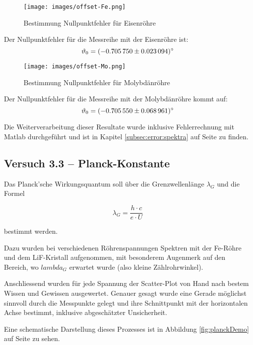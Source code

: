 \begin{figure}[h!]
    \centering
    \texttt{[image: images/offset-Fe.png]}
    \caption{Bestimmung Nullpunktfehler f\"ur Eisenr\"ohre}
    \label{fig:offset:fe}
\end{figure}
Der Nullpunktfehler f\"ur die Messreihe mit der Eisenr\"ohre ist:
$$\vartheta_0 = \SI{-0.70575 \pm 0.023094}{\degree}$$

\begin{figure}[h!]
    \centering
    \texttt{[image: images/offset-Mo.png]}
    \caption{Bestimmung Nullpunktfehler f\"ur Molybd\"anr\"ohre}
    \label{fig:offset:mo}
\end{figure}
Der Nullpunktfehler f\"ur die Messreihe mit der Molybd\"anr\"ohre kommt auf:
$$\vartheta_0 = \SI{-0.70555 \pm 0.068961}{\degree}$$

Die  Weiterverarbeitung dieser  Resultate wurde  inklusive Fehlerrechnung  mit
Matlab durchgef\"uhrt und ist  in Kapitel \ref{subsec:error:spektra} auf Seite
\pageref{subsec:error:spektra} zu finden.

\clearpage
\subsection{Versuch 3.3 -- Planck-Konstante}
\label{subsec:planck}

Das Planck'sche Wirkungsquantum soll \"uber die Grenzwellenl\"ange $\lambda_G$ und
die Formel

\begin{equation*}
    \lambda_G = \frac{h \cdot c}{e \cdot U}
\end{equation*}

bestimmt werden.

Dazu wurden  bei verschiedenen R\"ohrenspannungen Spektren  mit der Fe-R\"ohre
und dem LiF-Kristall aufgenommen, mit besonderem Augenmerk auf den Bereich, wo
$lambda_G$ erwartet wurde (also kleine Z\"ahlrohrwinkel).

Anschliessend  wurden  f\"ur jede  Spannung  der  Scatter-Plot von  Hand  nach
bestem  Wissen  und Gewissen  ausgewertet. Genauer  gesagt  wurde eine  Gerade
m\"oglichst sinnvoll durch die Messpunkte gelegt und ihre Schnittpunkt mit der
horizontalen Achse bestimmt, inklusive abgesch\"atzter Unsicherheit.

Eine   schematische   Darstellung   dieses    Prozesses   ist   in   Abbildung
\ref{fig:planckDemo} auf Seite \pageref{fig:planckDemo} zu sehen.

